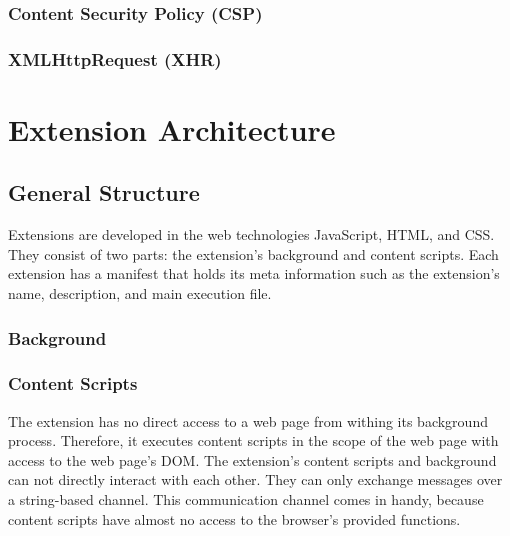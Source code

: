\subsubsection{Content Security Policy (CSP)}

\subsubsection{XMLHttpRequest (XHR)}



\newpage
\section{Extension Architecture}
	
\subsection{General Structure}

	Extensions are developed in the web technologies JavaScript, HTML, and CSS. They consist of two parts: the extension's background and content scripts. Each extension has a manifest that holds its meta information such as the extension's name, description, and main execution file.
	
\subsubsection{Background} 

\subsubsection{Content Scripts}

	The extension has no direct access to a web page from withing its background process. Therefore, it executes content scripts in the scope of the web page with access to the web page's DOM. The extension's content scripts and background can not directly interact with each other. They can only exchange messages over a string-based channel. This communication channel comes in handy, because content scripts have almost no access to the browser's provided functions. 
	
